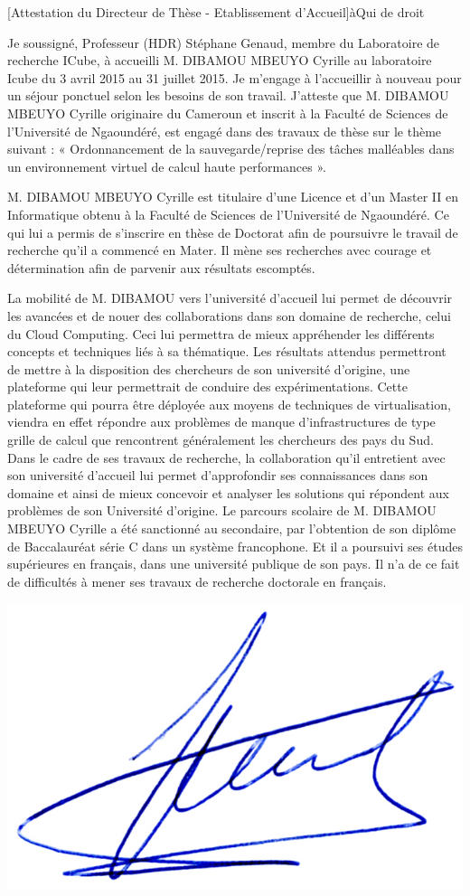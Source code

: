 \documentclass[a4paper,10pt]{article}
\begin{document}

\begin{letter}[Attestation du Directeur de Thèse - Etablissement d'Accueil]{à}{Qui de droit}

\vspace{-6mm}
  Je  soussigné, Professeur  (HDR)  Stéphane Genaud,  membre  du Laboratoire  de
  recherche ICube, à accueilli M. DIBAMOU MBEUYO Cyrille au laboratoire Icube du
  3 avril 2015 au 31 juillet 2015.  Je m’engage à l’accueillir à nouveau pour un
  séjour ponctuel  selon les besoins  de son  travail. J'atteste que  M. DIBAMOU
  MBEUYO Cyrille originaire  du Cameroun et inscrit à la  Faculté de Sciences de
  l'Université de Ngaoundéré, est engagé dans  des travaux de thèse sur le thème
  suivant : « Ordonnancement de la sauvegarde/reprise des tâches malléables dans
  un environnement virtuel de calcul haute performances ».

  M. DIBAMOU  MBEUYO Cyrille est  titulaire d’une Licence  et d’un Master  II en
  Informatique obtenu à la Faculté de Sciences de l'Université de Ngaoundéré. Ce
  qui lui  a permis  de s'inscrire en  thèse de Doctorat  afin de  poursuivre le
  travail de  recherche qu'il a commencé  en Mater. Il mène  ses recherches avec
  courage et détermination afin de parvenir aux résultats escomptés.

  La mobilité de M. DIBAMOU vers  l’université d'accueil lui permet de découvrir
  les avancées  et de nouer  des collaborations  dans son domaine  de recherche,
  celui  du  Cloud  Computing.  Ceci  lui permettra  de  mieux  appréhender  les
  différents concepts et techniques liés à sa thématique. Les résultats attendus
  permettront  de mettre  à  la  disposition des  chercheurs  de son  université
  d'origine,   une   plateforme   qui   leur   permettrait   de   conduire   des
  expérimentations.  Cette plateforme  qui pourra  être déployée  aux moyens  de
  techniques  de virtualisation,  viendra  en effet  répondre  aux problèmes  de
  manque d'infrastructures de type grille de calcul que rencontrent généralement
  les chercheurs des pays du Sud.  Dans le cadre de ses travaux de recherche, la
  collaboration  qu'il  entretient  avec  son université  d'accueil  lui  permet
  d'approfondir ses connaissances  dans son domaine et ainsi  de mieux concevoir
  et  analyser les  solutions  qui  répondent aux  problèmes  de son  Université
  d'origine.  Le parcours scolaire de M. DIBAMOU MBEUYO Cyrille a été sanctionné
  au secondaire, par l'obtention de son  diplôme de Baccalauréat série C dans un
  système francophone.  Et il  a poursuivi ses  études supérieures  en français,
  dans une université publique  de son pays. Il n'a de ce  fait de difficultés à
  mener ses travaux de recherche doctorale en français.

\end{letter}
\begin{flushright}
\includegraphics[width=.23\textwidth]{signgenaud.jpg}
\end{flushright}
\end{document}
